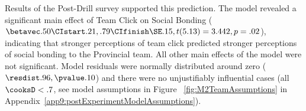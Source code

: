 








Results of the Post-Drill survey supported this prediction. The model revealed a significant main effect of Team Click on Social Bonding ($\betavec .50 \CIstart .21, .79 \CIfinish \SE .15, t(5.13) = 3.442, p = .02$), indicating that stronger perceptions of team click predicted stronger perceptions of social bonding to the Provincial team.  All other main effects of the model were not significant.  Model residuals were normally distributed around zero ($\resdist .96, \pvalue .10$) and there were no unjustifiably influential cases (all $\cooksD < .7$, see model assumptions in Figure ~\ref{fig:M2TeamAssumptions} in Appendix~\ref{app9:postExperimentModelAssumptions}).




